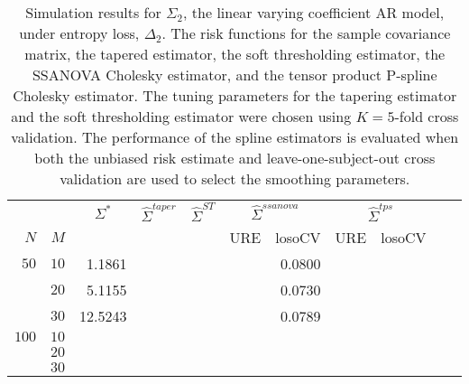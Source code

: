 \documentclass[12pt]{article}
\newcommand{\ra}[1]{\renewcommand{\arraystretch}{#1}}
\theoremstyle{definition}
\begin{document}
\begin{table}\centering
\ra{1.3}
\caption{Simulation results for $\Sigma_2$, the linear varying coefficient AR model, under entropy loss, $\Delta_2$. The risk functions for the sample covariance matrix, the tapered estimator, the soft thresholding estimator, the SSANOVA Cholesky estimator, and the tensor product P-spline Cholesky estimator. The tuning parameters for the tapering estimator and the soft thresholding estimator were chosen using $K = 5$-fold cross validation. The performance of the spline estimators is evaluated when both the unbiased risk estimate and leave-one-subject-out cross validation are used to select the smoothing parameters.}
\begin{tabular}{@{}rrrcrcrrcrr@{}}\toprule
   &            & \multicolumn{1}{c}{$\Sigma^*$}  & \multicolumn{1}{c}{$\hat{\Sigma}^{taper}$} &\multicolumn{1}{c}{$\hat{\Sigma}^{ST}$} &\multicolumn{2}{c}{ $\hat{\Sigma}^{ssanova}$} &  \multicolumn{2}{c}{ $\hat{\Sigma}^{tps}$}\\
$N$ & $M$ 	&	  &	& & \multicolumn{1}{c}{\mbox{URE}} & \multicolumn{1}{c}{\mbox{losoCV}} &\multicolumn{1}{c}{\mbox{URE}} & \multicolumn{1}{c}{\mbox{losoCV}}\\ \midrule
$50$ & $10$  & 1.1861	&&&&	0.0800&&\\
  & $20$  &   5.1155 &&&&    0.0730	&&\\
  & $30$   &  12.5243   &&&&  0.0789	&&\\ \midrule
$100$ & $10$ &&&&&	&&\\
& $20$  &&&&&&& \\
& $30$  &&&&&&& \\
\bottomrule
\end{tabular}
\end{table}

\end{document}
